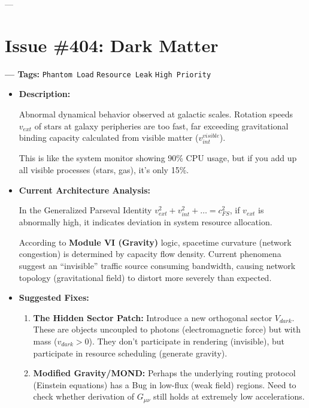 \documentclass[11pt,a4paper,twoside]{book}
\begin{document}
---

\section{Issue \#404: Dark Matter}

\textbf{--- Tags:} \texttt{Phantom Load} \texttt{Resource Leak} \texttt{High Priority}

\begin{itemize}
\item \textbf{Description:}

Abnormal dynamical behavior observed at galactic scales. Rotation speeds \textbf{$v_{ext}$} of stars at galaxy peripheries are too fast, far exceeding gravitational binding capacity calculated from visible matter (\textbf{$v_{int}^{visible}$}).

This is like the system monitor showing 90\% CPU usage, but if you add up all visible processes (stars, gas), it's only 15\%.

\item \textbf{Current Architecture Analysis:}

In the Generalized Parseval Identity \textbf{$v_{ext}^2 + v_{int}^2 + \dots = c_{FS}^2$}, if \textbf{$v_{ext}$} is abnormally high, it indicates deviation in system resource allocation.

According to \textbf{Module VI (Gravity)} logic, spacetime curvature (network congestion) is determined by capacity flow density. Current phenomena suggest an ``invisible'' traffic source consuming bandwidth, causing network topology (gravitational field) to distort more severely than expected.

\item \textbf{Suggested Fixes:}

\begin{enumerate}
\item \textbf{The Hidden Sector Patch:} Introduce a new orthogonal sector \textbf{$V_{dark}$}. These are objects uncoupled to photons (electromagnetic force) but with mass (\textbf{$v_{dark} > 0$}). They don't participate in rendering (invisible), but participate in resource scheduling (generate gravity).

\item \textbf{Modified Gravity/MOND:} Perhaps the underlying routing protocol (Einstein equations) has a Bug in low-flux (weak field) regions. Need to check whether derivation of \textbf{$G_{\mu\nu}$} still holds at extremely low accelerations.
\end{enumerate}
\end{itemize}
\end{document}

